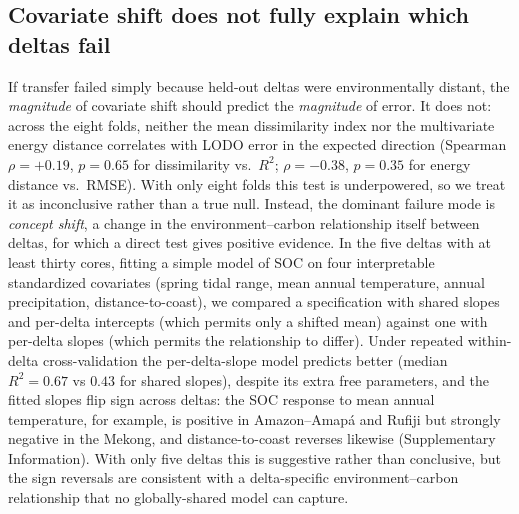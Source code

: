 \documentclass[twocolumn,9pt]{extarticle}
\begin{document}
\subsection*{Covariate shift does not fully explain which deltas fail}
If transfer failed simply because held-out deltas were environmentally distant, the
\emph{magnitude} of covariate shift should predict the \emph{magnitude} of error. It
does not: across the eight folds, neither the mean dissimilarity index nor the
multivariate energy distance correlates with LODO error in the expected direction
(Spearman $\rho=+0.19$, $p=0.65$ for dissimilarity vs.\ $R^2$; $\rho=-0.38$, $p=0.35$
for energy distance vs.\ RMSE). With only eight folds this test is underpowered, so we
treat it as inconclusive rather than a true null. Instead, the dominant failure mode is
\emph{concept shift}, a change in the environment--carbon relationship itself between
deltas, for which a direct test gives positive evidence. In the five deltas with at least
thirty cores, fitting a simple model of SOC on four interpretable standardized covariates
(spring tidal range, mean annual temperature, annual precipitation, distance-to-coast),
we compared a specification with shared slopes and per-delta intercepts (which permits
only a shifted mean) against one with per-delta slopes (which permits the relationship to
differ). Under repeated within-delta cross-validation the per-delta-slope model predicts
better (median $R^2=0.67$ vs $0.43$ for shared slopes), despite its extra free parameters,
and the fitted slopes flip sign across deltas: the SOC response to mean annual
temperature, for example, is positive in Amazon--Amap\'a and Rufiji but strongly negative
in the Mekong, and distance-to-coast reverses likewise (Supplementary Information). With
only five deltas this is suggestive rather than conclusive, but the sign reversals are
consistent with a delta-specific environment--carbon relationship that no globally-shared
model can capture.
\end{document}
